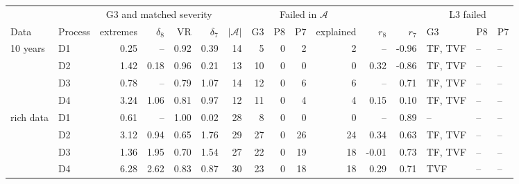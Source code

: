 \begin{tabular}{llrrrrrrrrrrrlll}
\toprule
& & \multicolumn{4}{c}{G3 and matched severity} & & \multicolumn{4}{c}{Failed in $\mathcal{A}$} & & & \multicolumn{3}{c}{L3 failed} \\
\cmidrule(lr){3-6}\cmidrule(lr){8-11}\cmidrule(lr){14-16}
Data & Process & extremes & $\delta_{8}$ & VR & $\delta_{7}$ & $|\mathcal{A}|$ & G3 & P8 & P7 & explained & $r_{8}$ & $r_{7}$ & G3 & P8 & P7 \\
\midrule
10 years & D1 & 0.25 & -- & 0.92 & 0.39 & 14 & 5 & 0 & 2 & 2 & -- & -0.96 & TF, TVF & -- & -- \\
 & D2 & 1.42 & 0.18 & 0.96 & 0.21 & 13 & 10 & 0 & 0 & 0 & 0.32 & -0.86 & TF, TVF & -- & -- \\
 & D3 & 0.78 & -- & 0.79 & 1.07 & 14 & 12 & 0 & 6 & 6 & -- & 0.71 & TF, TVF & -- & -- \\
 & D4 & 3.24 & 1.06 & 0.81 & 0.97 & 12 & 11 & 0 & 4 & 4 & 0.15 & 0.10 & TF, TVF & -- & -- \\
\addlinespace
rich data & D1 & 0.61 & -- & 1.00 & 0.02 & 28 & 8 & 0 & 0 & 0 & -- & 0.89 & -- & -- & -- \\
 & D2 & 3.12 & 0.94 & 0.65 & 1.76 & 29 & 27 & 0 & 26 & 24 & 0.34 & 0.63 & TF, TVF & -- & -- \\
 & D3 & 1.36 & 1.95 & 0.70 & 1.54 & 27 & 22 & 0 & 19 & 18 & -0.01 & 0.73 & TF, TVF & -- & -- \\
 & D4 & 6.28 & 2.62 & 0.83 & 0.87 & 30 & 23 & 0 & 18 & 18 & 0.29 & 0.71 & TVF & -- & -- \\
\bottomrule
\end{tabular}
